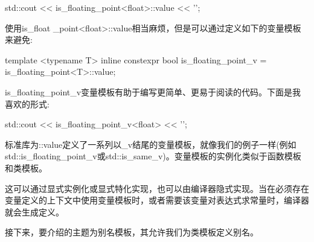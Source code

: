 \begin{cpp}
std::cout << is_floating_point<float>::value << '\n';
\end{cpp}

使用is\_float \_point<float>::value相当麻烦，但是可以通过定义如下的变量模板来避免:

\begin{cpp}
template <typename T>
inline constexpr bool is_floating_point_v =
	is_floating_point<T>::value;
\end{cpp}

is\_floating\_point\_v变量模板有助于编写更简单、更易于阅读的代码。下面是我喜欢的形式:

\begin{cpp}
std::cout << is_floating_point_v<float> << '\n';
\end{cpp}

标准库为::value定义了一系列以\_v结尾的变量模板，就像我们的例子一样(例如std::is\_floating\_point\_v或std::is\_same\_v)。变量模板的实例化类似于函数模板和类模板。

这可以通过显式实例化或显式特化实现，也可以由编译器隐式实现。当在必须存在变量定义的上下文中使用变量模板时，或者需要该变量对表达式求常量时，编译器就会生成定义。

接下来，要介绍的主题为别名模板，其允许我们为类模板定义别名。








